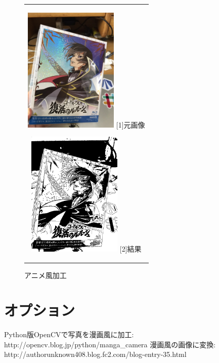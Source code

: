 \documentclass[a4paper,11pt,titlepage]{bxjsarticle}
\begin{document}
\begin{figure}[htbp]
  \begin{center}
    \begin{tabular}{c}
      \begin{minipage}{0.33\hsize}
        \begin{center}
          \includegraphics[clip, width=4.5cm]{./ギアス.jpg}
          \hspace{1.6cm} [1]元画像
        \end{center}
      \end{minipage}

      \begin{minipage}{0.33\hsize}
        \begin{center}
          \includegraphics[clip, width=4.5cm]{./result4.jpg}
          \hspace{1.6cm} [2]結果
        \end{center}
        
      \end{minipage}
       \end{tabular}
    \caption{アニメ風加工}
    \label{fig:lena}
  \end{center}
\end{figure}
\section{オプション}

\begin{thebibliography}{99}
 Python版OpenCVで写真を漫画風に加工: http://opencv.blog.jp/python/manga\_camera
 漫画風の画像に変換: http://authorunknown408.blog.fc2.com/blog-entry-35.html
\end{thebibliography}
\end{document}
